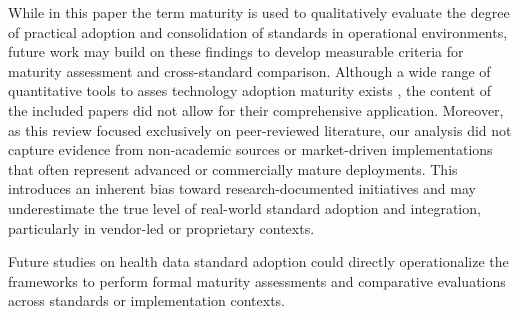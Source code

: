 While in this paper the term maturity is used to qualitatively evaluate the degree of practical adoption and consolidation of standards in operational environments, future work may build on these findings to develop measurable criteria for maturity assessment and cross-standard comparison. Although a wide range of quantitative tools to asses technology adoption maturity exists \cite{noauthor_paho_maturity_2022,measure_evaluation_his_toolkit,noauthor_himss_maturity,liaw_digital_2021}, the content of the included papers did not allow for their comprehensive application. Moreover, as this review focused exclusively on peer-reviewed literature, our analysis did not capture evidence from non-academic sources or market-driven implementations that often represent advanced or commercially mature deployments. This introduces an inherent bias toward research-documented initiatives and may underestimate the true level of real-world standard adoption and integration, particularly in vendor-led or proprietary contexts.

Future studies on health data standard adoption could directly operationalize the frameworks to perform formal maturity assessments and comparative evaluations across standards or implementation contexts.


